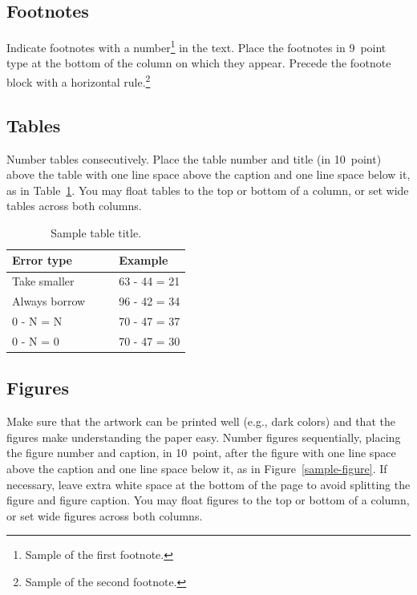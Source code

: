 \documentclass{ccn}  %
\begin{document}
\subsection{Footnotes}

Indicate footnotes with a number\footnote{Sample of the first footnote.} in the text.
Place the footnotes in 9~point type at the bottom of the column on which they appear.
Precede the footnote block with a horizontal rule.\footnote{Sample of the second
  footnote.}

\subsection{Tables}

Number tables consecutively.
Place the table number and title (in 10~point) above the table with one line space
above the caption and one line space below it, as in Table~\ref{sample-table}.
You may float tables to the top or bottom of a column, or set wide tables across both
columns.

\begin{table}[!ht]
  \begin{center}
    \caption{Sample table title.}
    \label{sample-table}
    \vskip 0.12in
    \begin{tabular}{ll}
      \hline
      Error type        & Example      \\
      \hline
      Take smaller      & 63 - 44 = 21 \\
      Always borrow~~~~ & 96 - 42 = 34 \\
      0 - N = N         & 70 - 47 = 37 \\
      0 - N = 0         & 70 - 47 = 30 \\
      \hline
    \end{tabular}
  \end{center}
\end{table}

\subsection{Figures}

Make sure that the artwork can be printed well (e.g., dark colors) and that the figures
make understanding the paper easy.
Number figures sequentially, placing the figure number and caption, in 10~point, after
the figure with one line space above the caption and one line space below it, as in
Figure~\ref{sample-figure}.
If necessary, leave extra white space at the bottom of the page to avoid splitting the
figure and figure caption.
You may float figures to the top or bottom of a column, or set wide figures across both
columns.
\end{document}
